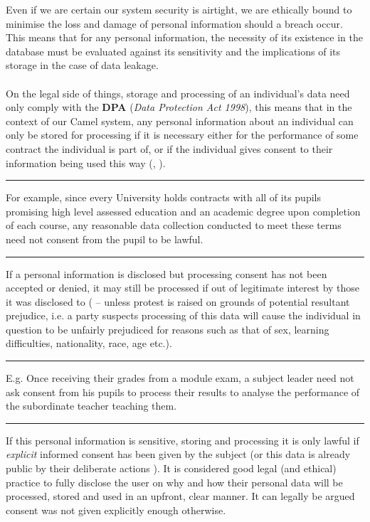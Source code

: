 Even if we are certain our system security is airtight, we are ethically bound to minimise the loss and damage of personal information should a breach occur. This means that for any personal information, the necessity of its existence in the database must be evaluated against its sensitivity and the implications of its storage in the case of data leakage.\\\\
On the legal side of things, storage and processing of an individual’s data need only comply with the \textbf{DPA} (\textit{Data Protection Act 1998}), this means that in the context of our Camel system, any personal information about an individual can only be stored for processing if it is necessary either for the performance of some contract the individual is part of, or if the individual gives consent to their information being used this way (\cite{DPA:tDPP:S1}, \cite{DPA:tDPP:S2}).
\vspace{0.35cm} \hrule {\raggedleft \scriptsize For example, since every University holds contracts with all of its pupils promising high level assessed education and an academic degree upon completion of each course, any reasonable data collection conducted to meet these terms need not consent from the pupil to be lawful.\par} \vspace{0.35cm} \hrule
If a personal information is disclosed but processing consent has not been accepted or denied, it may still be processed if out of legitimate interest by those it was disclosed to (\cite{DPA:tDPP:S2} -- unless protest is raised on grounds of potential resultant prejudice, i.e. a party suspects processing of this data will cause the individual in question to be unfairly prejudiced for reasons such as that of sex, learning difficulties, nationality, race, age etc.).
\vspace{0.35cm} \hrule {\raggedleft \scriptsize E.g. Once receiving their grades from a module exam, a subject leader need not ask consent from his pupils to process their results to analyse the performance of the subordinate teacher teaching them.\par} \vspace{0.35cm} \hrule
If this personal information is sensitive, storing and processing it is only lawful if \emph{explicit} informed consent has been given by the subject (or this data is already public by their deliberate actions \cite{DPA:tDPP:S3}). It is considered good legal (and ethical) practice to fully disclose the user on why and how their personal data will be processed, stored and used in an upfront, clear manner. It can legally be argued consent was not given explicitly enough otherwise.
